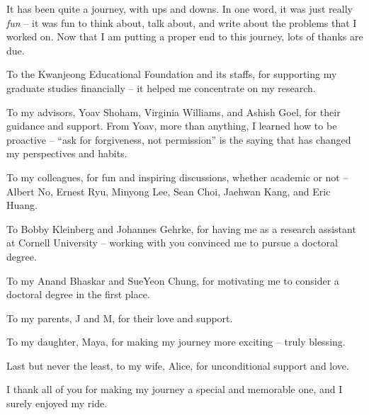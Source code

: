 It has been quite a journey, with ups and downs.
In one word, it was just really {\em fun} -- it was fun to think about, talk about, and write about the problems that I worked on. 
Now that I am putting a proper end to this journey, lots of thanks are due. 

To the Kwanjeong Educational Foundation and its staffs, for supporting my graduate studies financially -- it helped me concentrate on my research.

To my advisors, Yoav Shoham, Virginia Williams, and Ashish Goel, for their guidance and support. From Yoav, more than anything, I learned how to be proactive -- ``ask for forgiveness, not permission'' is the saying that has changed my perspectives and habits. 


To my colleagues, for fun and inspiring discussions, whether academic or not -- Albert No, Ernest Ryu, Minyong Lee, Sean Choi, Jaehwan Kang, and Eric Huang.

To Bobby Kleinberg and Johannes Gehrke, for having me as a research assistant at Cornell University -- working with you convinced me to pursue a doctoral degree.

To my Anand Bhaskar and SueYeon Chung, for motivating me to consider a doctoral degree in the first place.

To my parents, J and M, for their love and support.

To my daughter, Maya, for making my journey more exciting -- truly blessing.

Last but never the least, to my wife, Alice, for unconditional support and love.

I thank all of you for making my journey a special and memorable one, and I surely enjoyed my ride.


